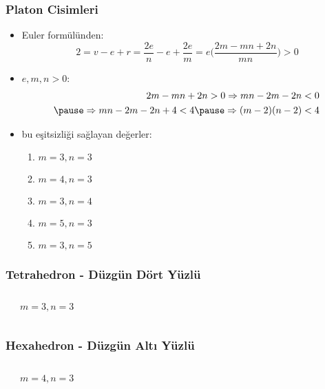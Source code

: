 \documentclass[dvipsnames]{beamer}
\theoremstyle{definition}
\theoremstyle{example}
\theoremstyle{plain}
\begin{document}
\begin{frame}
  \frametitle{Platon Cisimleri}

    \begin{itemize}
      \item Euler formülünden:
      \[
        2 = v - e + r = \frac{2e}{n} - e + \frac{2e}{m}
        = e \Big( \frac{2m-mn+2n}{mn} \Big) > 0
      \]

      \pause
      \item $e,m,n > 0$:
      \begin{eqnarray*}
        2m - mn + 2n > 0 \Rightarrow mn - 2m -2n < 0 \\\pause
        \Rightarrow mn - 2m - 2n + 4 < 4 \pause \Rightarrow (m - 2)(n - 2) < 4
      \end{eqnarray*}

      \pause
      \item bu eşitsizliği sağlayan değerler:
      \begin{enumerate}
        \item $m=3, n=3$
        \item $m=4, n=3$
        \item $m=3, n=4$
        \item $m=5, n=3$
        \item $m=3, n=5$
      \end{enumerate}
    \end{itemize}
\end{frame}

\begin{frame}
  \frametitle{Tetrahedron - Düzgün Dört Yüzlü}

  \begin{columns}
    \begin{center}
    \end{center}

    \begin{center}

      $m=3, n=3$
    \end{center}
  \end{columns}
\end{frame}

\begin{frame}
  \frametitle{Hexahedron - Düzgün Altı Yüzlü}

  \begin{columns}
    \begin{center}
    \end{center}

    \begin{center}

      $m=4, n=3$
    \end{center}
  \end{columns}
\end{frame}
\end{document}
